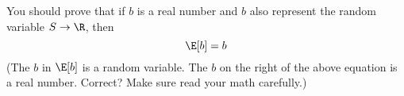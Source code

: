 You should prove that if $b$ is a real number and $b$ also represent the
random variable $S \rightarrow \R$, then
\[
  \E[b] = b
\]
(The $b$ in $\E[b]$ is a random variable. The $b$ on the right of the
above equation is a real number.
Correct?
Make sure read your math carefully.)
